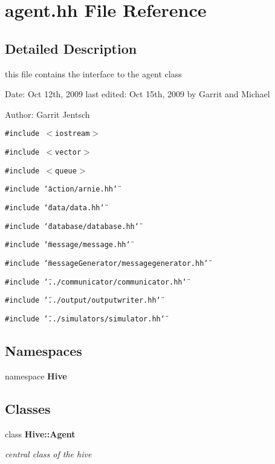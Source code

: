 \section{agent.hh File Reference}
\label{agent_8hh}


\subsection{Detailed Description}
this file contains the interface to the agent class

\begin{Desc}
\item[Date:]Oct 12th, 2009 last edited: Oct 15th, 2009 by Garrit and Michael\end{Desc}
\begin{Desc}
\item[Author:]Garrit Jentsch \end{Desc}


{\tt \#include $<$iostream$>$}\par
{\tt \#include $<$vector$>$}\par
{\tt \#include $<$queue$>$}\par
{\tt \#include \char`\"{}action/arnie.hh\char`\"{}}\par
{\tt \#include \char`\"{}data/data.hh\char`\"{}}\par
{\tt \#include \char`\"{}database/database.hh\char`\"{}}\par
{\tt \#include \char`\"{}message/message.hh\char`\"{}}\par
{\tt \#include \char`\"{}messageGenerator/messagegenerator.hh\char`\"{}}\par
{\tt \#include \char`\"{}../communicator/communicator.hh\char`\"{}}\par
{\tt \#include \char`\"{}../output/outputwriter.hh\char`\"{}}\par
{\tt \#include \char`\"{}../simulators/simulator.hh\char`\"{}}\par
\subsection*{Namespaces}
\begin{CompactItemize}
\item 
namespace {\bf Hive}
\end{CompactItemize}
\subsection*{Classes}
\begin{CompactItemize}
\item 
class {\bf Hive::Agent}
\begin{CompactList}\small\item\em central class of the hive \item\end{CompactList}\end{CompactItemize}

